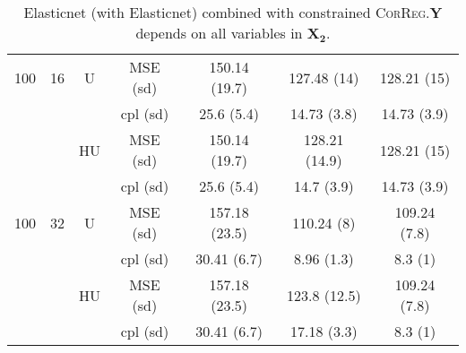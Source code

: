\documentclass[11pt,a4paper]{article}
\begin{document}
\begin{table}[h!]
\begin{tabular}{|c|c|c|c|c|c|c|}
\hline
\hline %
100 & 16 & U& MSE (sd) & 150.14 (19.7) & 127.48 (14) & 128.21 (15) \\
& & &  cpl (sd) & 25.6 (5.4) & 14.73 (3.8) & 14.73 (3.9) \\
 &  &HU &  MSE (sd) & 150.14 (19.7) & 128.21 (14.9) & 128.21 (15) \\
& & & cpl (sd) & 25.6 (5.4) & 14.7 (3.9) & 14.73 (3.9) \\
\hline %
100 & 32 & U& MSE (sd) & 157.18 (23.5) & 110.24 (8) & 109.24 (7.8) \\
& & &  cpl (sd) & 30.41 (6.7) & 8.96 (1.3) & 8.3 (1) \\
 &  &HU &  MSE (sd) & 157.18 (23.5) & 123.8 (12.5) & 109.24 (7.8) \\
& & & cpl (sd) & 30.41 (6.7) & 17.18 (3.3) & 8.3 (1) \\
\hline
\end{tabular} 
\caption{Elasticnet (with Elasticnet) combined with constrained \textsc{CorReg}.$\boldsymbol{Y}$  depends on all variables in $\boldsymbol{X_2}$.}\label{YX2linenet}
\end{table}
\end{document}
